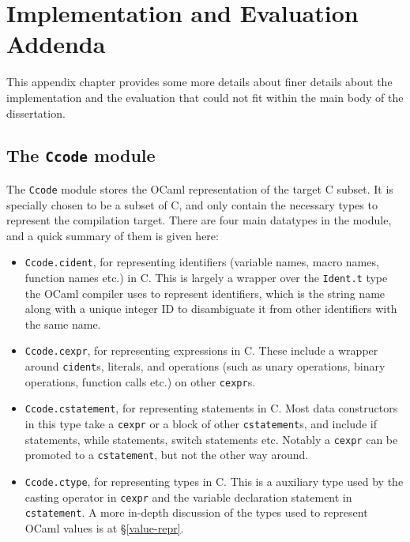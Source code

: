 \appendix

\chapter{Implementation and Evaluation Addenda}

This appendix chapter provides some more details about finer details about the
implementation and the evaluation that could not fit within the main body of the
dissertation.

\section{The \texttt{Ccode} module} \label{ccode}

The \texttt{Ccode} module stores the OCaml representation of the target C
subset. It is specially chosen to be a subset of C, and only contain the
necessary types to represent the compilation target. There are four main
datatypes in the module, and a quick summary of them is given here:

\begin{itemize}

\item \texttt{Ccode.cident}, for representing identifiers (variable names, macro
    names, function names etc.) in C. This is largely a wrapper over the
    \texttt{Ident.t} type the OCaml compiler uses to represent identifiers,
    which is the string name along with a unique integer ID to disambiguate it
    from other identifiers with the same name.

\item \texttt{Ccode.cexpr}, for representing expressions in C. These include a
    wrapper around \texttt{cident}s, literals, and operations (such as unary
    operations, binary operations, function calls etc.) on other
    \texttt{cexpr}s.

\item \texttt{Ccode.cstatement}, for representing statements in C. Most data
    constructors in this type take a \texttt{cexpr} or a block of other
    \texttt{cstatement}s, and include if statements, while statements, switch
    statements etc. Notably a \texttt{cexpr} can be promoted to a
    \texttt{cstatement}, but not the other way around.

\item \texttt{Ccode.ctype}, for representing types in C. This is a auxiliary
    type used by the casting operator in \texttt{cexpr} and the variable
    declaration statement in \texttt{cstatement}. A more in-depth discussion of
    the types used to represent OCaml values is at \S\ref{value-repr}.

\end{itemize}


